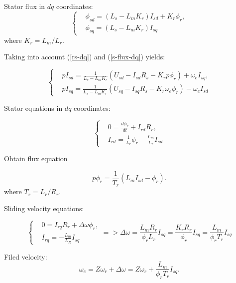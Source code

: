 \documentclass[11pt,a4paper,oneside]{report}
\begin{document}
Stator flux in $dq$ coordinates:
\begin{equation}
	\label{s-flux-dq}
	\left\{
	\begin{split}
		& \phi_{sd} = (L_s-L_mK_r)I_{sd}+K_r\phi_r, \\
		& \phi_{sq} = (L_s-L_mK_r)I_{sq}
	\end{split}
	\right.
\end{equation}
where $K_r=L_m/L_r$.

Taking into account (\ref{rs-dq}) and (\ref{s-flux-dq}) yields:

\begin{equation}
	\left\{
	\begin{split}
		& pI_{sd} = \frac{1}{L_s-L_mK_r}(U_{sd}-I_{sd}R_s-K_rp\phi_r)+\omega_e I_{sq},\\
		& pI_{sq} = \frac{1}{L_s-L_mK_r}(U_{sq}-I_{sq}R_s-K_r\omega_e\phi_r)-\omega_e I_{sd}
	\end{split}
	\right.
\end{equation}

Stator equations in $dq$ coordinates:

\begin{equation}
	\left\{
	\begin{split}
		& 0=\frac{d\phi_r}{dt}+I_{rd}R_r,\\
		& I_{rd} = \frac{1}{L_r}\phi_r-\frac{L_m}{L_r}I_{sd}
	\end{split}
	\right.
\end{equation}

Obtain flux equation

\begin{equation}
	p\phi_r = \frac{1}{T_r}(L_mI_{sd}-\phi_r).
\end{equation}
where $T_r=L_r/R_r$.

Sliding velocity equations:

\begin{equation}
	\left\{
	\begin{split}
		& 0 = I_{rq}R_r+\Delta\omega\phi_r,\\
		& I_{rq} = -\frac{L_m}{L_R}I_{sq}
	\end{split}
	\right.=>\Delta\omega=\frac{L_mR_r}{\phi_rL_r}I_{sq}=\frac{K_rR_r}{\phi_r}I_{sq}=\frac{L_m}{\phi_rT_r}I_{sq}
\end{equation}

Filed velocity:
\begin{equation}
	\omega_e = Z\omega_r+\Delta\omega= Z\omega_r+\frac{L_m}{\phi_rT_r}I_{sq}.
\end{equation}
\end{document}
